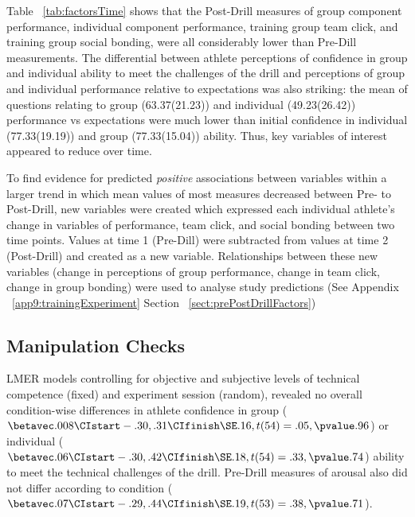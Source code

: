 
Table ~\ref{tab:factorsTime} shows that the Post-Drill measures of group component performance, individual component performance, training group team click, and training group social bonding, were all considerably lower than Pre-Dill measurements. The differential between athlete perceptions of confidence in group and individual ability to meet the challenges of the drill and perceptions of group and individual performance relative to expectations was also striking: the mean of questions relating to group (63.37(21.23)) and individual (49.23(26.42)) performance vs expectations were much lower than initial confidence in individual (77.33(19.19)) and group (77.33(15.04)) ability.  Thus, key variables of interest appeared to reduce over time.





To find evidence for predicted \textit{positive} associations between variables within a larger trend in which mean values of most measures decreased between Pre- to Post-Drill, new variables were created which expressed each individual athlete's change in variables of performance, team click, and social bonding between two time points.  Values at time 1 (Pre-Dill) were subtracted from values at time 2 (Post-Drill) and created as a new variable.  Relationships between these new variables (change in perceptions of group performance, change in team click, change in group bonding) were used to analyse study predictions (See Appendix ~\ref{app9:trainingExperiment} Section ~\ref{sect:prePostDrillFactors})







\subsection{Manipulation Checks}

LMER models controlling for objective and subjective levels of technical competence (fixed) and experiment session (random), revealed no overall condition-wise differences in athlete confidence in group ($\betavec .008 \CIstart -.30, .31 \CIfinish \SE .16, t(54)= .05, \pvalue .96$) or individual ($\betavec .06 \CIstart -.30, .42 \CIfinish \SE .18, t(54)= .33, \pvalue .74$) ability to meet the technical challenges of the drill.  Pre-Drill measures of arousal also did not differ according to condition ($\betavec .07 \CIstart -.29, .44 \CIfinish \SE .19, t(53)= .38, \pvalue .71$).

